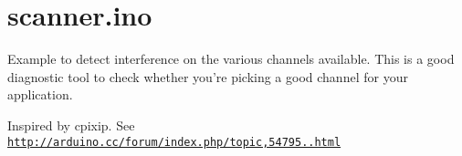 \hypertarget{scanner_8ino-example}{\section{scanner.\+ino}
}
Example to detect interference on the various channels available. This is a good diagnostic tool to check whether you're picking a good channel for your application.

Inspired by cpixip. See \href{http://arduino.cc/forum/index.php/topic,54795.0.html}{\tt http\+://arduino.\+cc/forum/index.\+php/topic,54795..\+html}


\begin{DoxyCodeInclude}
\end{DoxyCodeInclude}
 